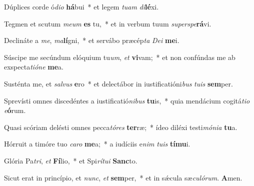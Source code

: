 \item Dúplices corde ó\textit{dio} \textbf{há}bui~* et legem \textit{tuam} \textit{di}\textbf{lé}xi.

\item Tegmen et scutum \textit{meum} \textbf{es} tu,~* et in verbum tuum \textit{superspe}\textbf{rá}vi.

\item Declináte a \textit{me}, \textit{ma}\textbf{lí}gni,~* et servábo præcép\textit{ta} \textit{Dei} \textbf{me}i.

\item Súscipe me secúndum elóquium tu\textit{um}, \textit{et} \textbf{vi}vam;~* et non confúndas me ab exspecta\textit{tióne} \textbf{me}a.

\item Susténta me, et \textit{salvus} \textbf{e}ro~* et delectábor in iustificatióni\textit{bus} \textit{tuis} \textbf{sem}per.

\item Sprevísti omnes discedéntes a iustificatió\textit{nibus} \textbf{tu}is,~* quia mendácium cogitá\textit{tio} \textit{e}\textbf{ó}rum.

\item Quasi scóriam delésti omnes pecca\textit{tóres} \textbf{ter}ræ;~* ídeo diléxi testi\textit{mónia} \textbf{tu}a.

\item Hórruit a timóre tuo \textit{caro} \textbf{me}a;~* a iudíciis e\textit{nim} \textit{tuis} \textbf{tí}\textbf{mu}i.

\item Glória Pa\textit{tri}, \textit{et} \textbf{Fí}lio,~* et Spi\textit{rítui} \textbf{Sanc}to.

\item Sicut erat in princípio, et \textit{nunc}, \textit{et} \textbf{sem}per,~* et in sǽcula sæ\textit{culórum}. \textbf{A}men.
